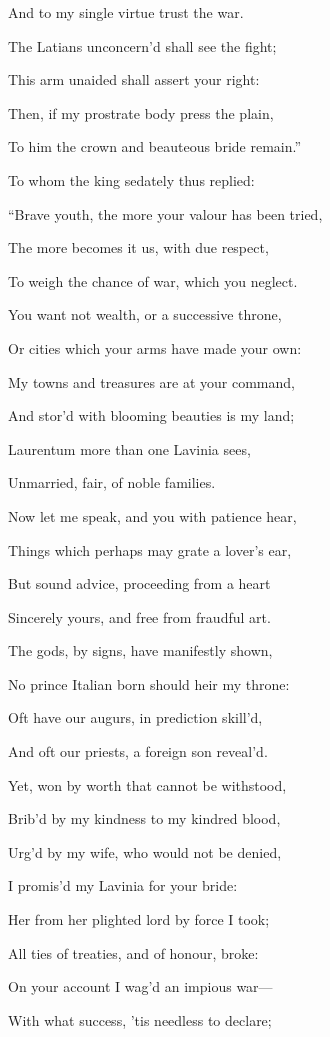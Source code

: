 And to my single virtue trust the war.

The Latians unconcern’d shall see the fight;

This arm unaided shall assert your right:

Then, if my prostrate body press the plain,

To him the crown and beauteous bride remain.”

To whom the king sedately thus replied:

“Brave youth, the more your valour has been tried,

The more becomes it us, with due respect,

To weigh the chance of war, which you neglect.

You want not wealth, or a successive throne,

Or cities which your arms have made your own:

My towns and treasures are at your command,

And stor’d with blooming beauties is my land;

Laurentum more than one Lavinia sees,

Unmarried, fair, of noble families.

Now let me speak, and you with patience hear,

Things which perhaps may grate a lover’s ear,

But sound advice, proceeding from a heart

Sincerely yours, and free from fraudful art.

The gods, by signs, have manifestly shown,

No prince Italian born should heir my throne:

Oft have our augurs, in prediction skill’d,

And oft our priests, a foreign son reveal’d.

Yet, won by worth that cannot be withstood,

Brib’d by my kindness to my kindred blood,

Urg’d by my wife, who would not be denied,

I promis’d my Lavinia for your bride:

Her from her plighted lord by force I took;

All ties of treaties, and of honour, broke:

On your account I wag’d an impious war—

With what success, ’tis needless to declare;

